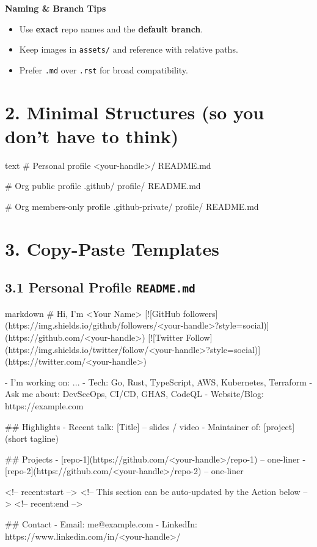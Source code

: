 \documentclass[11pt]{article}
\renewcommand{\kbd}[1]{\texttt{#1}}
\begin{document}
\begin{tcolorbox}
\textbf{Naming \& Branch Tips}
\begin{itemize}
  \item Use \textbf{exact} repo names and the \textbf{default branch}.
  \item Keep images in \kbd{assets/} and reference with relative paths.
  \item Prefer \texttt{.md} over \texttt{.rst} for broad compatibility.
\end{itemize}
\end{tcolorbox}
\clearpage

\section*{2. Minimal Structures (so you don't have to think)}
\begin{code}{text}
# Personal profile
<your-handle>/
  README.md

# Org public profile
.github/
  profile/
    README.md

# Org members-only profile
.github-private/
  profile/
    README.md
\end{code}

\section*{3. Copy-Paste Templates}

\subsection*{3.1 Personal Profile \texttt{README.md}}
\begin{code}{markdown}
# Hi, I'm <Your Name>
[![GitHub followers](https://img.shields.io/github/followers/<your-handle>?style=social)](https://github.com/<your-handle>)
[![Twitter Follow](https://img.shields.io/twitter/follow/<your-handle>?style=social)](https://twitter.com/<your-handle>)

- I'm working on: ...
- Tech: Go, Rust, TypeScript, AWS, Kubernetes, Terraform
- Ask me about: DevSecOps, CI/CD, GHAS, CodeQL
- Website/Blog: https://example.com

## Highlights
- Recent talk: [Title] -- slides / video
- Maintainer of: [project] (short tagline)

## Projects
- [repo-1](https://github.com/<your-handle>/repo-1) -- one-liner
- [repo-2](https://github.com/<your-handle>/repo-2) -- one-liner

<!-- recent:start -->
<!-- This section can be auto-updated by the Action below -->
<!-- recent:end -->

## Contact
- Email: me@example.com - LinkedIn: https://www.linkedin.com/in/<your-handle>/
\end{code}
\end{document}
